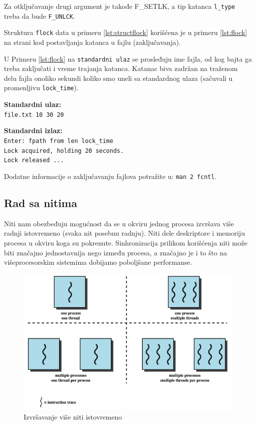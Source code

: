 \documentclass[a4paper, 11pt, twoside]{article}
\newcommand{\scode}[3] {
	\hspace{.06\textwidth} 
	\begin{minipage}[t]{.88\textwidth} %
		\begin{mdframed}[topline=true,bottomline=true,leftline=true,rightline=true,backgroundcolor=gray!22, linecolor=gray!60!black,roundcorner=1mm]
			 

	\begin{center}
		\caption{\textbf{Primer \ref{lst:#3}:} #2}
	\end{center}
	\end{mdframed}
	\end{minipage}

}
\newcommand{\stdio}[4] {
	\hspace{.06\textwidth} 
	\begin{minipage}[t]{.88\textwidth} %
		\begin{mdframed}[backgroundcolor=black!7,topline=true,bottomline=true,leftline=true,rightline=true,roundcorner=1mm]
		\begin{minipage}[t]{.5\textwidth} %
			\textbf{#1} \\
				\texttt{#3}
		\end{minipage}
		\begin{minipage}[t]{.5\textwidth} %
			\textbf{#2} \\
				\texttt{#4}
		\end{minipage}
		\end{mdframed}
	\end{minipage}
	\vspace{3mm} 
}
\begin{document}
Za otključavanje drugi argument je takođe F\_SETLK, a tip katanca \texttt{l\_type} treba da bude \texttt{F\_UNLCK}.

\vspace{2mm} 
\scode{struct_flock.c}{Struktura flock}{structflock}
\vspace{4mm} 

Struktura \texttt{flock} data u primeru \ref{lst:structflock} korišćena je u primeru \ref{lst:flock} na strani \pageref{lst:flock} kod postavljanja katanca u fajlu (zaključavanja).
 
\newpage

U Primeru \ref{lst:flock} na \texttt{standardni ulaz} se prosleđuju ime fajla, od kog bajta ga treba zaključati i vreme trajanja katanca. Katanac biva zadržan na traženom delu fajla onoliko sekundi koliko smo uneli sa standardnog ulaza (sačuvali u promenljivu \texttt{lock\_time}).

\vspace{2mm} 
\scode{flock.c}{Zaključavanje fajla}{flock}
\stdio{Standardni ulaz:}{Standardni izlaz:}{\texttt{file.txt 10 30 20}}{\texttt{Enter: fpath from len lock\_time\\Lock acquired, holding 20 seconds.\\ Lock released ...}}

\vspace{3mm} 
Dodatne informacije o zaključavanju fajlova potražite u: \texttt{man 2 fcntl}.

\newpage

\subsection{Rad sa nitima}

Niti nam obezbeđuju mogućnost da se u okviru jednog procesa izvršava više radnji istovremeno (svaka nit posebnu radnju). Niti dele deskriptore i memoriju procesa u okviru koga su pokrenute. Sinhronizacija prilikom korišćenja niti može biti značajno jednostavnija nego između procesa, a značajno je i to što na višeprocesorskim sistemima dobijamo poboljšane performanse.
\vspace{3mm} 

\begin{figure}[h]
	\centering
	\includegraphics[width=.7\textwidth]{./img/mthread.png} %
	\vspace{-2mm} 
	\caption{Izvršavanje više niti istovremeno}
	\label{fig:mthread}
\end{figure}
\end{document}
